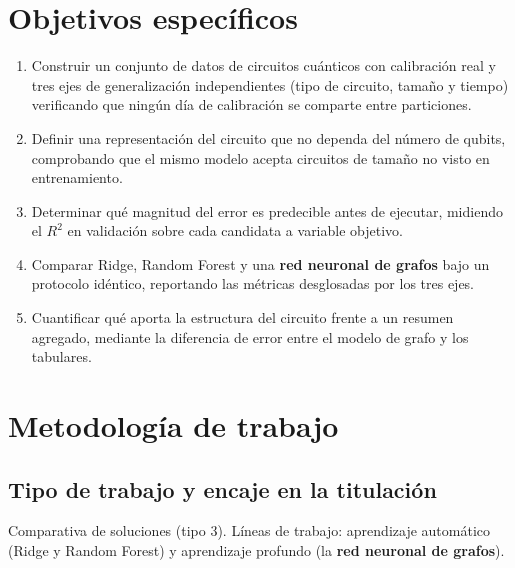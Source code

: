 \section{Objetivos específicos}
\label{sec:objetivos_especificos}
\begin{enumerate}
    \item Construir un conjunto de datos de circuitos cuánticos con calibración real y
          tres ejes de generalización independientes (tipo de circuito, tamaño y tiempo)
          verificando que ningún día de calibración se comparte entre particiones.
    \item Definir una representación del circuito que no dependa del número de qubits,
          comprobando que el mismo modelo acepta circuitos de tamaño no visto en
          entrenamiento.
    \item Determinar qué magnitud del error es predecible antes de ejecutar, midiendo el
          $R^2$ en validación sobre cada candidata a variable objetivo.
    \item Comparar Ridge, Random Forest y una \textbf{red neuronal de grafos} bajo un protocolo
          idéntico, reportando las métricas desglosadas por los tres ejes.
    \item Cuantificar qué aporta la estructura del circuito frente a un resumen agregado,
          mediante la diferencia de error entre el modelo de grafo y los tabulares.
\end{enumerate}


\section{Metodología de trabajo}
\label{sec:metodologia}

\subsection{Tipo de trabajo y encaje en la titulación}
\label{sec:tipo_trabajo}
Comparativa de soluciones (tipo 3). Líneas de trabajo: aprendizaje automático (Ridge y
Random Forest) y aprendizaje profundo (la \textbf{red neuronal de grafos}).

